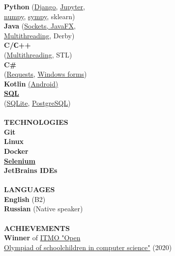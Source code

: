 \documentclass{article}
\begin{document}
\begin{vwcol}[widths={0.8,0.2},
 sep=.8cm, justify=flush,rule=0pt,indent=1em]
\textbf{Python} (\href{https://github.com/igoose1/wikirace}{Django}, \href{https://github.com/NikPeg/synchronization-of-neuromorphic-networks-of-the-close-world-from-the-point-of-view-of-complexes}{Jupyter},\\
\href{https://github.com/NikPeg/Reinforcement-learning-for-resource-allocation-tasks-in-the-cloud}{numpy}, \href{https://github.com/NikPeg/Calculus_and_Algebra_sympy}{sympy}, sklearn)\\
\textbf{Java} (\href{https://github.com/NikPeg/jigsaw_sockets_and_saving}{Sockets, JavaFX,}\\
\href{https://github.com/NikPeg/StudentsBooks}{Multithreading}, Derby)\\
\textbf{C/С++}\\
(\href{https://github.com/NikPeg/OS_multithreaded_tasks}{Multithreading}, STL)\\
\textbf{C\#}\\
(\href{https://gitlab.com/peganov.nik/messengerapi}{Requests}, \href{https://gitlab.com/peganov.nik/diveintofractal}{Windows forms})\\
\textbf{Kotlin} \href{https://gitlab.com/peganov.nik/smartlearning}{(Android)}\\
\textbf{\href{https://github.com/NikPeg/CoffeePult}{SQL}}\\
(\href{https://github.com/NikPeg/ExtraterrestrialBot}{SQLite}, \href{https://github.com/NikPeg/CoffeePult}{PostgreSQL})\\
\\
\noindent\textcolor[rgb]{0.1255,0.2902,0.7843}{\textbf{TECHNOLOGIES}}\\
\textbf{
Git\\
Linux\\
Docker\\
\href{https://github.com/NikPeg/csbot}{Selenium}\\
JetBrains IDEs\\
}
\\
\noindent\textcolor[rgb]{0.1255,0.2902,0.7843}{\textbf{LANGUAGES}}\\
\textbf{English} (B2)\\
\textbf{Russian} (Native speaker)\\
\\
\noindent\textcolor[rgb]{0.1255,0.2902,0.7843}{\textbf{ACHIEVEMENTS}}\\
\textbf{Winner} of \href{https://olymp.itmo.ru/}{ITMO "Open\\ Olympiad of schoolchildren in computer science"} (2020)\\

\end{vwcol}
\end{document}
